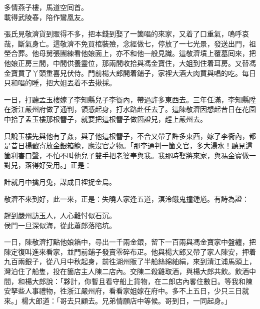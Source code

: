 \begin{myquote}
多情燕子樓，馬道空囘首。\\載得武陵春，陪作鸞凰友。
\end{myquote}

張氏見敬濟貨到販得不多，把本錢到娶了一箇唱的來家，又着了口重氣，嗚呼哀哉，斷氣身亡。{}這敬濟不免買棺裝殮，念經做七，停放了一七光景，發送出門，祖塋合葬。他母舅張團練看他娘面上，亦不和他一般見識。{}這敬濟墳上覆墓囘來，把他娘正房三間，中間供養靈位，那兩間收拾與馮金寶住，大姐到住着耳房。又替馮金寶買了丫頭重喜兒伏侍。門前楊大郎開着鋪子，家裡大酒大肉買與唱的吃。每日只和唱的睡，把大姐丟着不去揪採。

一日，打聽孟玉樓嫁了李知縣兒子李衙內，帶過許多東西去。三年任滿，李知縣陞在浙江嚴州府做了通判，領憑起身，打水路赴任去了。這陳敬濟因想起昔日在花園中拾了孟玉樓那根簪子，就要把這根簪子做箇證兒，趕上嚴州去。

只說玉樓先與他有了姦，與了他這根簪子，不合又帶了許多東西，嫁了李衙內，都是昔日楊戩寄放金銀箱籠，應沒官之物。{}「那李通判一箇文官，多大湯水！聽見這箇利害口聲，不怕不叫他兒子雙手把老婆奉與我。我那時娶將來家，與馮金寶做一對兒，落得好受用。」正是：

\begin{myquote}
計就月中擒月兔，謀成日裡捉金烏。
\end{myquote}

敬濟不來到好，此一來，正是：失曉人家逢五道，溟泠餓鬼撞鍾馗。有詩為證：

\begin{myquote}
趕到嚴州訪玉人，人心難忖似石沉。\\侯門一旦深似海，從此蕭郎落陷坑。
\end{myquote}

一日，陳敬濟打點他娘箱中，尋出一千兩金銀，留下一百兩與馮金寶家中盤纏，把陳定復叫進來看家，並門前鋪子發賣零碎布疋。他與楊大郎又帶了家人陳安，押着九百兩銀子，從八月中秋起身，前徃湖州販了半船絲綿紬絹，來到清江浦馬頭上，灣泊住了船隻，投在箇店主人陳二店內。交陳二殺雞取酒，與楊大郎共飲。飲酒中間，和楊大郎說：「夥計，你暫且看守船上貨物，{}在二郎店內畧住數日。等我和陳安拏些人事禮物，徃浙江嚴州府，看看家姐嫁在府中。多不上五日，少只三日就來。」楊大郎道：「哥去只顧去。兄弟情願店中等候。哥到日，一同起身。」

